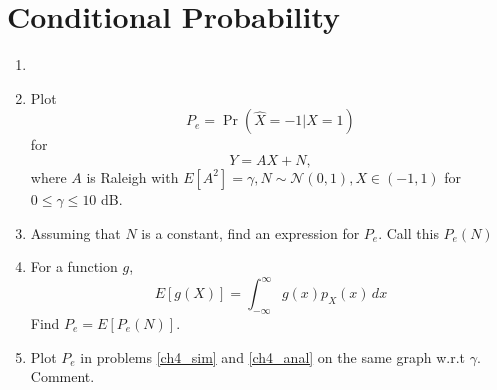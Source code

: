 \documentclass[journal,12pt,twocolumn]{IEEEtran}
\numberwithin{equation}{section}
\renewcommand\thesection{\arabic{section}}
\providecommand{\pr}[1]{\ensuremath{\Pr\left(#1\right)}}
\providecommand{\sbrak}[1]{\ensuremath{{}\left[#1\right]}}
\providecommand{\brak}[1]{\ensuremath{\left(#1\right)}}
\providecommand{\gauss}[2]{\mathcal{N}\ensuremath{\left(#1,#2\right)}}
\begin{document}
\section{Conditional Probability}
\begin{enumerate}[label=\thesection.\arabic*
        ,ref=\thesection.\theenumi]
    \item
    \item
          \label{ch4_sim}
          Plot
          \begin{equation}
              P_e = \pr{\hat{X} = -1|X=1}
          \end{equation}
          for
          \begin{equation}
              Y = AX+N,
          \end{equation}
          where $A$ is Raleigh with $E\sbrak{A^2} = \gamma, N \sim \gauss{0}{1}, X \in \brak{-1,1}$ for $0 \le \gamma \le 10$ dB.
    \item
          Assuming that $N$ is a constant, find an expression for $P_e$.  Call this $P_e(N)$
    \item
          \label{ch4_anal}
          For a function $g$,
          \begin{equation}
              E\sbrak{g(X)} = \int_{-\infty}^{\infty}g(x)p_{X}(x)\, dx
          \end{equation}
          Find $P_e = E\sbrak{P_e(N)}$.
    \item
          Plot $P_e$ in problems \ref{ch4_sim} and \ref{ch4_anal} on the same graph w.r.t $\gamma$.  Comment.
\end{enumerate}
\end{document}
